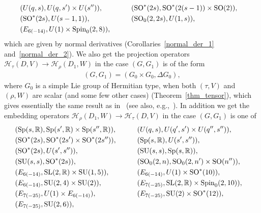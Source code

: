 \documentclass[pdftex]{sigma}
\numberwithin{equation}{section}
\newcommand{\BR}{\mathbb{R}}
\newcommand{\cH}{\mathcal{H}}
\begin{document}
\begin{alignat}{3}
&(U(q,s),U(q,s')\times U(s'')),\qquad & &(\operatorname{SO}^*(2s),\operatorname{SO}^*(2(s-1))\times \operatorname{SO}(2)),& \notag\\
&(\operatorname{SO}^*(2s),U(s-1,1)),\qquad & &(\operatorname{SO}_0(2,2s),U(1,s)), & \label{list_normal_derivative}\\
&(E_{6(-14)},U(1)\times \operatorname{Spin}_0(2,8)), \qquad &&& \notag
\end{alignat}
which are given by normal derivatives (Corollaries~\ref{normal_der_1} and~\ref{normal_der_2}). We also get the projection operators $\cH_\tau(D,V)\rightarrow\cH_\rho(D_1,W)$ in the case $(G,G_1)$ is of the form
\begin{gather*} (G,G_1)=(G_0\times G_0,\Delta G_0), \end{gather*}
where $G_0$ is a simple Lie group of Hermitian type, when both $(\tau,V)$ and $(\rho,W)$ are scalar (and some few other cases) (Theorem~\ref{thm_tensor}), which gives essentially the same result as in~\cite{PZ} (see also, e.g.,~\cite{BCK,OR,P}).
In addition we get the embedding operators $\cH_\rho(D_1,W)\rightarrow\cH_\tau(D,V)$ in the case $(G,G_1)$ is one of
\begin{alignat}{3}
&(\operatorname{Sp}(s,\BR), \operatorname{Sp}(s',\BR)\times \operatorname{Sp}(s'',\BR)),\qquad & &(U(q,s), U(q',s')\times U(q'',s'')),&\notag\\
&(\operatorname{SO}^*(2s), \operatorname{SO}^*(2s')\times \operatorname{SO}^*(2s'')),\qquad & &(\operatorname{Sp}(s,\BR), U(s',s'')),&\notag\\
&(\operatorname{SO}^*(2s), U(s',s'')),\qquad & &(\operatorname{SU}(s,s), \operatorname{Sp}(s,\BR)),&\notag\\
&(\operatorname{SU}(s,s), \operatorname{SO}^*(2s)),\qquad & &(\operatorname{SO}_0(2,n), \operatorname{SO}_0(2,n')\times \operatorname{SO}(n'')), &\notag\\
&(E_{6(-14)},{\rm SL}(2,\BR)\times \operatorname{SU}(1,5)),\qquad & &(E_{6(-14)},U(1)\times \operatorname{SO}^*(10)),&\notag\\
&(E_{6(-14)},\operatorname{SU}(2,4)\times \operatorname{SU}(2)),\qquad & &(E_{7(-25)},{\rm SL}(2,\BR)\times \operatorname{Spin}_0(2,10)),&\notag\\
&(E_{7(-25)},U(1)\times E_{6(-14)}),\qquad & &(E_{7(-25)},\operatorname{SU}(2)\times \operatorname{SO}^*(12)),&\notag\\
&(E_{7(-25)},\operatorname{SU}(2,6)),\qquad &&&\label{list_infinite_order}
\end{alignat}
\end{document}
